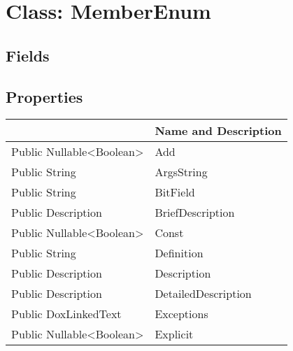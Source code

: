 \documentclass[11pt, oneside, a4paper]{book}
\begin{document}
\hypertarget{SoftwareEngineeringTools.{}Documentation.{}MemberEnum}{}
\section{Class: MemberEnum}

\subsection{Fields}

\subsection{Properties}
\begin{center}
\begin{tabular}{| p{3cm} | p{12cm} | }
\hline
\textbf{ } & \textbf{ Name and Description}\\
\hline
 Public  Nullable<Boolean> &  Add\hypertarget{SoftwareEngineeringTools.{}Documentation.{}MemberEnum.{}Add}{}\\
\hline
 Public  String &  ArgsString\hypertarget{SoftwareEngineeringTools.{}Documentation.{}MemberEnum.{}ArgsString}{}\\
\hline
 Public  String &  BitField\hypertarget{SoftwareEngineeringTools.{}Documentation.{}MemberEnum.{}BitField}{}\\
\hline
 Public  Description &  BriefDescription\hypertarget{SoftwareEngineeringTools.{}Documentation.{}MemberEnum.{}BriefDescription}{}\\
\hline
 Public  Nullable<Boolean> &  Const\hypertarget{SoftwareEngineeringTools.{}Documentation.{}MemberEnum.{}Const}{}\\
\hline
 Public  String &  Definition\hypertarget{SoftwareEngineeringTools.{}Documentation.{}MemberEnum.{}Definition}{}\\
\hline
 Public  Description &  Description\hypertarget{SoftwareEngineeringTools.{}Documentation.{}MemberEnum.{}Description}{}\\
\hline
 Public  Description &  DetailedDescription\hypertarget{SoftwareEngineeringTools.{}Documentation.{}MemberEnum.{}DetailedDescription}{}\\
\hline
 Public  DoxLinkedText &  Exceptions\hypertarget{SoftwareEngineeringTools.{}Documentation.{}MemberEnum.{}Exceptions}{}\\
\hline
 Public  Nullable<Boolean> &  Explicit\hypertarget{SoftwareEngineeringTools.{}Documentation.{}MemberEnum.{}Explicit}{}\\
\hline

\end{tabular}
\end{center}
\end{document}
